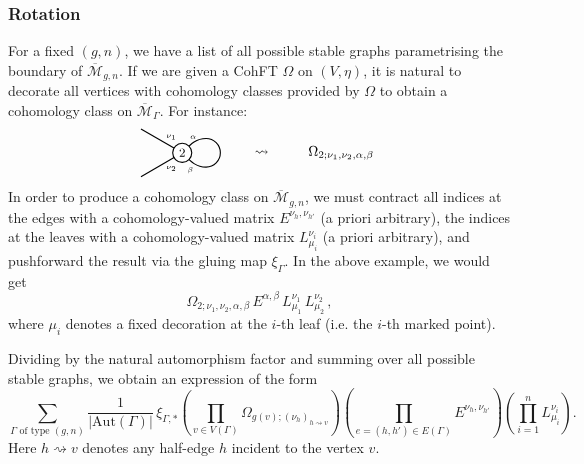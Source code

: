 \documentclass[11pt,reqno]{amsart}
\numberwithin{equation}{section}
\newcommand{\Aut}{\mathrm{Aut}}
\newcommand{\mc}[1]{\mathcal{#1}}
\newcommand{\M}{\mc{M}}
\newcommand{\Mbar}{\overline{\M}}
\theoremstyle{plain}
\theoremstyle{definition}
\begin{document}
\subsubsection{Rotation}
For a fixed $(g,n)$, we have a list of all possible stable graphs parametrising the boundary of $\Mbar_{g,n}$. If we are given a CohFT $\Omega$ on $(V,\eta)$, it is natural to decorate all vertices with cohomology classes provided by $\Omega$ to obtain a cohomology class on $\Mbar_{\Gamma}$. For instance:
\begin{equation}
  \begin{tikzpicture}[baseline,scale=.8]
    \draw[thick] (0,0) -- (150:1.5);
    \draw[thick] (0,0) -- (-150:1.5);
      
    \draw[thick,rotate=-90] (0,0) to[out=45,in=-90] (.45,.75) to[out=90,in=0] (0,1.2) to[out=180,in=90] (-.45,.75) to[out=-90,in=135] (0,0);

    \draw[thick,fill=white] (0,0) circle[radius=.3cm];
    \node at (0,0) {\small$2$};

    \node at (125:.6) {\tiny$\nu_1$};
    \node at (-125:.6) {\tiny$\nu_2$};
    \node at (55:.6) {\tiny$\alpha$};
    \node at (-65:.6) {\tiny$\beta$};

    \node at (2.5,0) {$\rightsquigarrow$};

    \node at (5,0) {$\Omega_{2;\nu_1,\nu_2,\alpha,\beta}$};
  \end{tikzpicture}
\end{equation}
In order to produce a cohomology class on $\Mbar_{g,n}$, we must contract all indices at the edges with a cohomology-valued matrix $E^{\nu_h,\nu_{h'}}$ (a priori arbitrary), the indices at the leaves with a cohomology-valued matrix $L_{\mu_i}^{\nu_i}$ (a priori arbitrary), and pushforward the result via the gluing map $\xi_{\Gamma}$. In the above example, we would get
\begin{equation}
  \Omega_{2;\nu_1,\nu_2,\alpha,\beta} \,
  E^{\alpha,\beta} \,
  L_{\mu_1}^{\nu_1} \,
  L_{\mu_2}^{\nu_2} \,,
\end{equation}
where $\mu_i$ denotes a fixed decoration at the $i$-th leaf (i.e. the $i$-th marked point).

Dividing by the natural automorphism factor and summing over all possible stable graphs, we obtain an expression of the form
\begin{equation}\label{eq:naive:rotation}
  \sum_{\Gamma \text{ of type }(g,n)}
    \frac{1}{|\Aut(\Gamma)|} \,
    \xi_{\Gamma,*}
      \left(
      \prod_{v \in V(\Gamma)}
        \Omega_{g(v);(\nu_h)_{h \rightsquigarrow v}}
      \right) \!
      \left(
      \prod_{e = (h,h') \in E(\Gamma)}
        E^{\nu_{h},\nu_{h'}}
      \right) \!
      \left(
      \prod_{i = 1}^{n}
        L_{\mu_i}^{\nu_i}
      \right) .
\end{equation}
Here $h \rightsquigarrow v$ denotes any half-edge $h$ incident to the vertex $v$.
\end{document}
